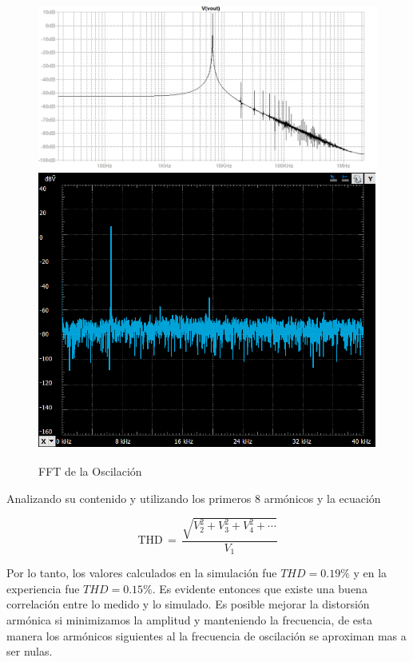 \begin{figure}[H]
    \centering
    \includegraphics[scale = 0.7]{../2-OscFase/Informe/fftsim.PNG}
    \includegraphics[scale = 0.8]{../2-OscFase/Informe/fft6k.png}
    \caption{FFT de la Oscilación}
    \label{ej2fft}
\end{figure}

Analizando su contenido y utilizando los primeros 8 armónicos y la ecuación

$$\mathrm{THD} \,= \,\frac{ \sqrt{V_2^2 + V_3^2 + V_4^2 + \cdots} }{V_1}$$

Por lo tanto, los valores calculados en la simulación fue $THD = 0.19\%$ y en la experiencia fue $THD = 0.15\%$. Es evidente entonces que existe una buena correlación entre lo medido y lo simulado. Es posible mejorar la distorsión armónica si minimizamos la amplitud y manteniendo la frecuencia, de esta manera los armónicos siguientes al la frecuencia de oscilación se aproximan mas a ser nulas. 

